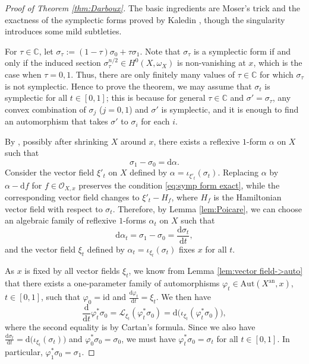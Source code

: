 \documentclass[12pt]{amsart}
\theoremstyle{definition}
\newcommand{\bC}{\mathbb{C}}
\newcommand{\cO}{\mathcal{O}}
\newcommand{\cL}{\mathcal{L}}
\newcommand{\rd}{\mathrm{d}}
\newcommand{\Aut}{\mathrm{Aut}}
\newcommand{\an}{\mathrm{an}}
\numberwithin{equation}{section}
\begin{document}
\begin{proof}[Proof of Theorem \ref{thm:Darboux}]
The basic ingredients are Moser's trick \cite{Moser-trick} and the exactness of the symplectic forms proved by Kaledin \cite{Kaledin-sym}, though the singularity introduces some mild subtleties. 

For $\tau\in\bC$, let $\sigma_\tau := (1-\tau)\sigma_0 + \tau \sigma_1$. Note that $\sigma_\tau$ is a symplectic form if and only if the induced section $\sigma_\tau^{n/2}\in H^0(X,\omega_X)$ is non-vanishing at $x$, which is the case when $\tau=0,1$. Thus, there are only finitely many values of $\tau\in\bC$ for which $\sigma_\tau$ is not symplectic. Hence to prove the theorem, we may assume that $\sigma_t$ is symplectic for all $t\in [0,1]$; this is because for general $\tau\in \bC$ and $\sigma'=\sigma_\tau$, any convex combination of $\sigma_j$ ($j=0,1$) and $\sigma'$ is symplectic, and it is enough to find an automorphism that takes $\sigma'$ to $\sigma_i$ for each $i$.

By \cite[Corollary 2.8]{Kaledin-sym}, possibly after shrinking $X$ around $x$, there exists a reflexive $1$-form $\alpha$ on $X$ such that 
\begin{equation} \label{eq:symp form exact}
\sigma_1 - \sigma_0 = \rd \alpha.    
\end{equation}
Consider the vector field $\xi'_t$ on $X$ defined by $\alpha = \iota_{\xi'_t}(\sigma_t)$. Replacing $\alpha$ by $\alpha-\rd f$ for $f\in \cO_{X,x}$ preserves the condition \eqref{eq:symp form exact}, while the corresponding vector field changes to $\xi'_t-H_f$, where $H_f$ is the Hamiltonian vector field with respect to $\sigma_t$. Therefore, by Lemma \ref{lem:Poicare}, we can choose an algebraic family of reflexive $1$-forms $\alpha_t$ on $X$ such that
\[
\rd \alpha_t = \sigma_1-\sigma_0 = \frac{\rd \sigma_{t}}{\rd t},
\]
and the vector field $\xi_t$ defined by $\alpha_t = \iota_{\xi_t}(\sigma_t)$ fixes $x$ for all $t$. %

As $x$ is fixed by all vector fields $\xi_t$, we know from Lemma \ref{lem:vector field->auto} that there exists a one-parameter family of automorphisms $\varphi_t\in \Aut(X^{\an},x)$, $t\in [0,1]$, such that $\varphi_0=\mathrm{id}$ and $\frac{\rd \varphi_t}{\rd t} = \xi_t$. We then have 
\[
\frac{\rd}{\rd t} \varphi_t^*\sigma_0 = \cL_{\xi_t} (\varphi_t^*\sigma_0) = \rd\big(\iota_{\xi_t}(\varphi_t^*\sigma_0)\big),
\]
where the second equality is by Cartan's formula. Since we also have $\frac{\rd \sigma_t}{\rd t} = \rd \big(\iota_{\xi_t}(\sigma_t)\big)$ and $\varphi^*_0 \sigma_0 = \sigma_0$, we must have $\varphi^*_t \sigma_0 = \sigma_t$ for all $t\in [0,1]$. In particular, $\varphi_1^*\sigma_0 = \sigma_1$.
\end{proof}
\end{document}
